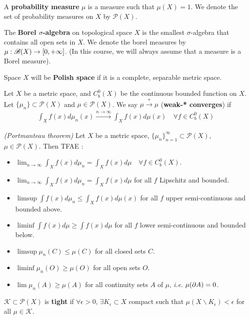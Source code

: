 \documentclass[12pt,a4paper]{article}
\renewenvironment{i}
{\begin{itemize} 
	}%
	{\end{itemize}
}
\begin{document}
\quad A \textbf{probability measure} $\mu$ is a measure such that $\mu(X)=1$. We denote the set of probability measures on $X$ by $\mathscr{P}(X)$.

\quad The \textbf{Borel $\sigma$-algebra} on topological space $X$ is the smallest $\sigma$-algebra that contains all open sets in $X$. We denote the borel measures by $\mu : \mathscr{B}(X) \rightarrow [0, +\infty]$. (In this course, we will always assume that a measure is a Borel measure).

\quad Space $X$ will be \textbf{Polish space} if it is a complete, separable metric space.
\s

 Let $X$ be a metric space, and $C_b^0(X)$ be the continuous bounded function on $X$. Let $\{\mu_n\} \subset \mathscr{P}(X)$ and $\mu\in \mathscr{P}(X)$. We say $\mu \xrightarrow{*} \mu$ (\textbf{weak-* converges}) if
\begin{align*}
\int_X f(x) d\mu_n(x) \xrightarrow{n\rightarrow \infty} \int_X f(x) d\mu(x) \quad \forall f\in C_b^0(X)
\end{align*}
\s

 \emph{(Portmanteau theorem)} Let $X$ be a metric space, $\{\mu_n\}_{n=1}^{\infty} \subset \mathscr{P}(X)$, $\mu \in \mathscr{P}(X)$. Then TFAE :
\begin{i}
\item $\lim_{n\rightarrow \infty} \int_X f(x) d\mu_n =\int_X f(x) d\mu \quad \forall f\in C_b^0(X)$.
\item $\lim_{n\rightarrow \infty} \int_X f(x) d\mu_n =\int_X f(x) d\mu$ for all $f$ Lipschitz and bounded.
\item $\limsup \int f(x) d\mu_n \leq \int_X f(x) d\mu(x)$ for all $f$ upper semi-continuous and bounded above.
\item $\liminf \int f(x) d\mu \geq \int f(x) d\mu$ for all $f$ lower semi-continuous and bounded below.
\item $\limsup \mu_n(C) \leq \mu(C)$ for all closed sets $C$.
\item $\liminf \mu_n(O) \geq \mu(O)$ for all open sets $O$.
\item $\lim \mu_n(A) \geq \mu(A)$ for all continuity sets $A$ of $\mu$, \textit{i.e.} $\mu(\partial A) =0$.
\end{i}
\s

 $\mathscr{K} \subset \mathscr{P}(X)$ is \textbf{tight} if $\forall \epsilon >0$, $\exists K_{\epsilon} \subset X$ compact such that $\mu(X \backslash K_{\epsilon}) <\epsilon$ for all $\mu \in \mathscr{K}$.
\end{document}
